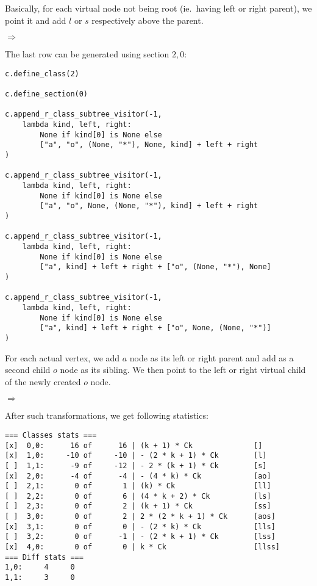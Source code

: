 \documentclass[final]{article}
\theoremstyle{definition}
\theoremstyle{remark}
\newcommand{\includeinlinesvg}[2]{\begin{minipage}{#1\textwidth}\end{minipage}}
\begin{document}
Basically, for each virtual node not being root (ie.\ having left or right parent), we point it and add \(l\) or \(s\) respectively above the parent.

\includeinlinesvg{.32}{lambda__trees_111__1_base}%
\(\Rightarrow\)
\includeinlinesvg{.32}{lambda__trees_101__0}%
\includeinlinesvg{.32}{lambda__trees_112__0}%

The last row can be generated using section \(2, 0\):

\begin{lstlisting}
c.define_class(2)

c.define_section(0)

c.append_r_class_subtree_visitor(-1,
    lambda kind, left, right:
        None if kind[0] is None else
        ["a", "o", (None, "*"), None, kind] + left + right
)

c.append_r_class_subtree_visitor(-1,
    lambda kind, left, right:
        None if kind[0] is None else
        ["a", "o", None, (None, "*"), kind] + left + right
)

c.append_r_class_subtree_visitor(-1,
    lambda kind, left, right:
        None if kind[0] is None else
        ["a", kind] + left + right + ["o", (None, "*"), None]
)

c.append_r_class_subtree_visitor(-1,
    lambda kind, left, right:
        None if kind[0] is None else
        ["a", kind] + left + right + ["o", None, (None, "*")]
)
\end{lstlisting}

For each actual vertex, we add \(a\) node as its left or right parent and add as a second child \(o\) node as its sibling. We then point to the left or right virtual child of the newly created \(o\) node.

\includeinlinesvg{.20}{lambda__trees_200__0_base}%
\(\Rightarrow\)
\includeinlinesvg{.20}{lambda__trees_200__0}%
\includeinlinesvg{.20}{lambda__trees_201__0}%
\includeinlinesvg{.20}{lambda__trees_202__0}%
\includeinlinesvg{.20}{lambda__trees_203__0}%

After such transformations, we get following statistics:

\begin{lstlisting}
=== Classes stats ===
[x]  0,0:      16 of      16 | (k + 1) * Ck              []
[x]  1,0:     -10 of     -10 | - (2 * k + 1) * Ck        [l]
[ ]  1,1:      -9 of     -12 | - 2 * (k + 1) * Ck        [s]
[x]  2,0:      -4 of      -4 | - (4 * k) * Ck            [ao]
[ ]  2,1:       0 of       1 | (k) * Ck                  [ll]
[ ]  2,2:       0 of       6 | (4 * k + 2) * Ck          [ls]
[ ]  2,3:       0 of       2 | (k + 1) * Ck              [ss]
[ ]  3,0:       0 of       2 | 2 * (2 * k + 1) * Ck      [aos]
[x]  3,1:       0 of       0 | - (2 * k) * Ck            [lls]
[ ]  3,2:       0 of      -1 | - (2 * k + 1) * Ck        [lss]
[x]  4,0:       0 of       0 | k * Ck                    [llss]
=== Diff stats ===
1,0:     4     0
1,1:     3     0
\end{lstlisting}
\end{document}
